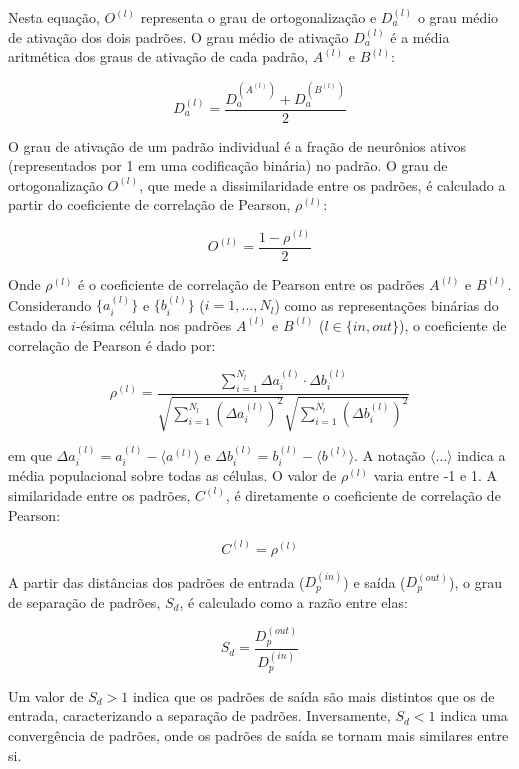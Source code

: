 Nesta equação, $O^{(l)}$ representa o grau de ortogonalização e $D_a^{(l)}$ o grau médio de ativação dos dois padrões. O grau médio de ativação $D_a^{(l)}$ é a média aritmética dos graus de ativação de cada padrão, $A^{(l)}$ e $B^{(l)}$:

\begin{equation}
    \label{eq:da}
    D_a^{(l)} = \frac{D_a^{(A^{(l)})} + D_a^{(B^{(l)})}}{2}
\end{equation}

O grau de ativação de um padrão individual é a fração de neurônios ativos (representados por 1 em uma codificação binária) no padrão.
O grau de ortogonalização $O^{(l)}$, que mede a dissimilaridade entre os padrões, é calculado a partir do coeficiente de correlação de Pearson, $\rho^{(l)}$:

\begin{equation}
    \label{eq:o}
    O^{(l)} = \frac{1 - \rho^{(l)}}{2}
\end{equation}

Onde $\rho^{(l)}$ é o coeficiente de correlação de Pearson entre os padrões $A^{(l)}$ e $B^{(l)}$.
Considerando $\{a_i^{(l)}\}$ e $\{b_i^{(l)}\}$ ($i=1, \dots, N_l$) como as representações binárias do estado da $i$-ésima célula nos padrões $A^{(l)}$ e $B^{(l)}$ ($l \in \{in, out\}$), o coeficiente de correlação de Pearson é dado por:

\begin{equation}
    \label{eq:pearson}
    \rho^{(l)} = \frac{\sum_{i=1}^{N_l} \Delta a_i^{(l)} \cdot \Delta b_i^{(l)}}{\sqrt{\sum_{i=1}^{N_l} (\Delta a_i^{(l)})^2} \sqrt{\sum_{i=1}^{N_l} (\Delta b_i^{(l)})^2}}
\end{equation}

em que $\Delta a_i^{(l)} = a_i^{(l)} - \langle a^{(l)} \rangle$ e $\Delta b_i^{(l)} = b_i^{(l)} - \langle b^{(l)} \rangle$. A notação $\langle \dots \rangle$ indica a média populacional sobre todas as células. O valor de $\rho^{(l)}$ varia entre -1 e 1.
A similaridade entre os padrões, $C^{(l)}$, é diretamente o coeficiente de correlação de Pearson:

\begin{equation}
    \label{eq:c}
    C^{(l)} = \rho^{(l)}
\end{equation}

A partir das distâncias dos padrões de entrada ($D_p^{(in)}$) e saída ($D_p^{(out)}$), o grau de separação de padrões, $S_d$, é calculado como a razão entre elas:

\begin{equation}
    \label{eq:sd}
    S_d = \frac{D_p^{(out)}}{D_p^{(in)}}
\end{equation}

Um valor de $S_d > 1$ indica que os padrões de saída são mais distintos que os de entrada, caracterizando a separação de padrões. Inversamente, $S_d < 1$ indica uma convergência de padrões, onde os padrões de saída se tornam mais similares entre si.




